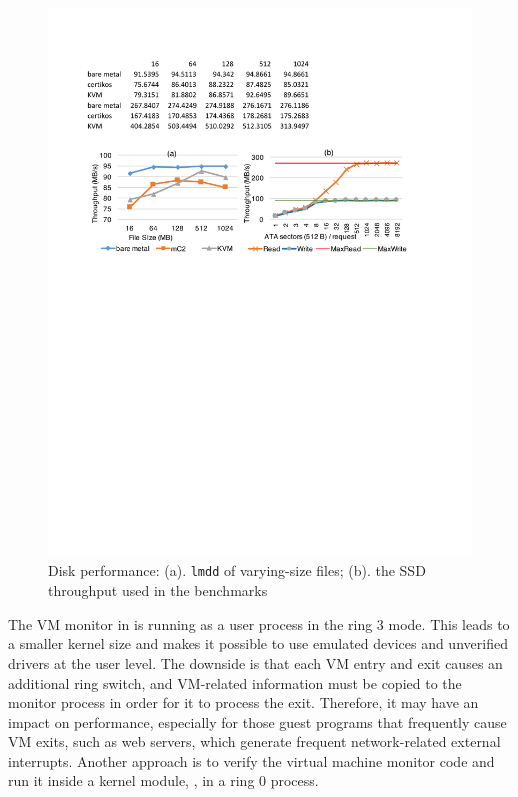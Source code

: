 \begin{figure}\centering
		\includegraphics[width=15cm]{figs/disk.pdf}
		\caption{Disk performance: (a). \texttt{lmdd} of varying-size files; (b). the SSD throughput used in the benchmarks}
		\label{fig:eval_disk}
		\hrulefill
\end{figure}


The VM monitor in \mCTOShyper{} is running as a user
process in the ring 3 mode. This leads to a smaller kernel
size and makes it possible to use emulated devices and unverified
drivers at the user level.  The downside is that each
VM entry and exit causes an additional ring switch, and VM-related
information must be copied to the monitor process in order for it to
process the exit. Therefore, it may have an impact on performance,
especially for those guest programs that frequently cause VM exits,
such as web servers, which generate frequent network-related external
interrupts.  Another approach is to verify the virtual machine monitor
code and run it inside a kernel module, \eg, in a ring 0 process.




